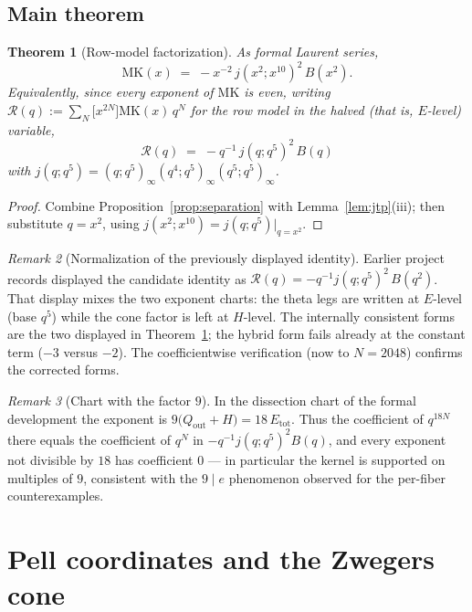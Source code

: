 \documentclass[12pt]{amsart}
\newtheorem{theorem}{Theorem}[section]
\theoremstyle{definition}
\theoremstyle{remark}
\newtheorem{remark}[theorem]{Remark}
\newcommand{\MK}{\mathrm{MK}}
\begin{document}
\subsection{Main theorem}

\begin{theorem}[Row-model factorization]\label{thm:mk-factorization}
As formal Laurent series,
\[
  \MK(x)\;=\;-x^{-2}\,j(x^2;x^{10})^{2}\,B(x^{2}).
\]
Equivalently, since every exponent of $\MK$ is even, writing
$\mathcal R(q):=\sum_{N}\bigl[x^{2N}\bigr]\MK(x)\,q^{N}$ for the
row model in the halved (that is, $E$-level) variable,
\[
  \boxed{\ \mathcal R(q)\;=\;-q^{-1}\,j(q;q^5)^{2}\,B(q)\ }
\]
with $j(q;q^5)=(q;q^5)_\infty(q^4;q^5)_\infty(q^5;q^5)_\infty$.
\end{theorem}

\begin{proof}
Combine Proposition~\ref{prop:separation} with
Lemma~\ref{lem:jtp}(iii); then substitute $q=x^2$, using
$j(x^2;x^{10})=j(q;q^5)\big|_{q=x^2}$.
\end{proof}

\begin{remark}[Normalization of the previously displayed identity]
\label{rem:normalization}
Earlier project records displayed the candidate identity as
$\mathcal R(q)=-q^{-1}j(q;q^5)^2\,B(q^2)$.  That display mixes the two
exponent charts: the theta legs are written at $E$-level (base $q^5$)
while the cone factor is left at $H$-level.  The internally consistent
forms are the two displayed in
Theorem~\ref{thm:mk-factorization}; the hybrid form fails already at
the constant term ($-3$ versus $-2$).  The coefficientwise
verification (now to $N=2048$) confirms the corrected forms.
\end{remark}

\begin{remark}[Chart with the factor $9$]
In the dissection chart of the formal development the exponent is
$9\bigl(Q_{\mathrm{out}}+H\bigr)=18\,E_{\mathrm{tot}}$.  Thus the
coefficient of $q^{18N}$ there equals the coefficient of $q^N$ in
$-q^{-1}j(q;q^5)^2B(q)$, and every exponent not divisible by $18$ has
coefficient $0$ — in particular the kernel is supported on multiples
of $9$, consistent with the $9\mid e$ phenomenon observed for the
per-fiber counterexamples.
\end{remark}


\section{Pell coordinates and the Zwegers cone}\label{sec:pell}
\end{document}
